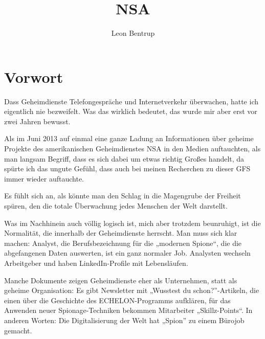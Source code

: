 \documentclass[12pt,a4paper]{scrartcl}
\author{Leon Bentrup}
\title{NSA}
\begin{document}
\maketitle
\tableofcontents
\newpage
{}

\section{Vorwort}
Dass Geheimdienste Telefongespräche und Internetverkehr überwachen, hatte ich eigentlich nie bezweifelt. Was das wirklich bedeutet, das wurde mir aber erst vor zwei Jahren bewusst.

Als im Juni 2013 auf einmal eine ganze Ladung an Informationen über geheime Projekte des amerikanischen Geheimdienstes NSA in den Medien auftauchten, als man langsam Begriff, dass es sich dabei um etwas richtig Großes handelt, da spürte ich das ungute Gefühl, dass auch bei meinen Recherchen zu dieser GFS immer wieder auftauchte.

Es fühlt sich an, als könnte man den Schlag in die Magengrube der Freiheit spüren, den die totale Überwachung jedes Menschen der Welt darstellt.

Was im Nachhinein auch völlig logisch ist, mich aber trotzdem beunruhigt, ist die Normalität, die innerhalb der Geheimdienste herrscht. Man muss sich klar machen: Analyst, die Berufsbezeichnung für die „modernen Spione“, die die abgefangenen Daten auswerten, ist ein ganz normaler Job. Analysten wechseln Arbeitgeber und haben LinkedIn-Profile mit Lebensläufen.

Manche Dokumente zeigen Geheimdienste eher als Unternehmen, statt als geheime Organisation: Es gibt Newsletter mit „Wusstest du schon?”-Artikeln, die einen über die Geschichte des ECHELON-Programms aufklären, für das Anwenden neuer Spionage-Techniken bekommen Mitarbeiter „Skillz-Points“. In anderen Worten: Die Digitalisierung der Welt hat „Spion” zu einem Bürojob gemacht.
\end{document}

